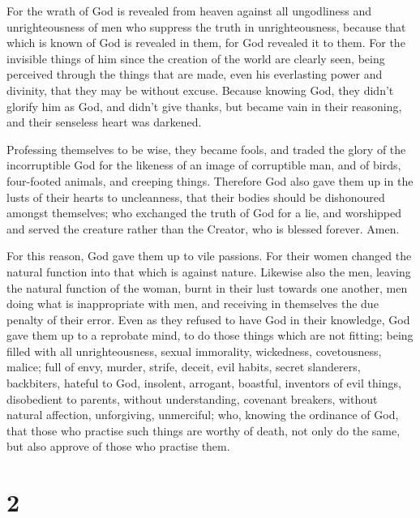  For the wrath of God is revealed from heaven against all
ungodliness and unrighteousness of men who suppress the truth in
unrighteousness,  because that which is known of God is
revealed in them, for God revealed it to them.  For the
invisible things of him since the creation of the world are clearly
seen, being perceived through the things that are made, even his
everlasting power and divinity, that they may be without excuse.
 Because knowing God, they didn't glorify him as God, and
didn't give thanks, but became vain in their reasoning, and their
senseless heart was darkened.

 Professing themselves to be wise, they became fools,
 and traded the glory of the incorruptible God for the
likeness of an image of corruptible man, and of birds, four-footed
animals, and creeping things.  Therefore God also gave them
up in the lusts of their hearts to uncleanness, that their bodies should
be dishonoured amongst themselves;  who exchanged the truth
of God for a lie, and worshipped and served the creature rather than the
Creator, who is blessed forever. Amen.

 For this reason, God gave them up to vile passions. For
their women changed the natural function into that which is against
nature.  Likewise also the men, leaving the natural
function of the woman, burnt in their lust towards one another, men
doing what is inappropriate with men, and receiving in themselves the
due penalty of their error.  Even as they refused to have
God in their knowledge, God gave them up to a reprobate mind, to do
those things which are not fitting;  being filled with all
unrighteousness, sexual immorality, wickedness, covetousness, malice;
full of envy, murder, strife, deceit, evil habits, secret slanderers,
 backbiters, hateful to God, insolent, arrogant, boastful,
inventors of evil things, disobedient to parents,  without
understanding, covenant breakers, without natural affection,
unforgiving, unmerciful;  who, knowing the ordinance of
God, that those who practise such things are worthy of death, not only
do the same, but also approve of those who practise them.

\hypertarget{section-1}{%
\section{2}\label{section-1}}

